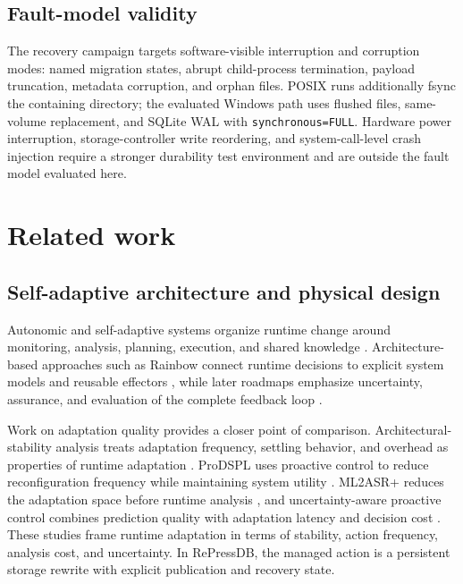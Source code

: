 \documentclass[final,5p,times,twocolumn,authoryear]{elsarticle}
\begin{document}
\subsection{Fault-model validity}

The recovery campaign targets software-visible interruption and corruption modes: named migration states, abrupt child-process termination, payload truncation, metadata corruption, and orphan files. POSIX runs additionally fsync the containing directory; the evaluated Windows path uses flushed files, same-volume replacement, and SQLite WAL with \texttt{synchronous=FULL}. Hardware power interruption, storage-controller write reordering, and system-call-level crash injection require a stronger durability test environment and are outside the fault model evaluated here.

\section{Related work}
\label{sec:related_work}

\subsection{Self-adaptive architecture and physical design}

Autonomic and self-adaptive systems organize runtime change around monitoring, analysis, planning, execution, and shared knowledge \citep{kephart2003vision,salehie2009landscape}. Architecture-based approaches such as Rainbow connect runtime decisions to explicit system models and reusable effectors \citep{garlan2004rainbow}, while later roadmaps emphasize uncertainty, assurance, and evaluation of the complete feedback loop \citep{delemos2013roadmap,krupitzer2015survey}.

Work on adaptation quality provides a closer point of comparison. Architectural-stability analysis treats adaptation frequency, settling behavior, and overhead as properties of runtime adaptation \citep{salama2017stability}. ProDSPL uses proactive control to reduce reconfiguration frequency while maintaining system utility \citep{ayala2021prodspl}. ML2ASR+ reduces the adaptation space before runtime analysis \citep{quin2022adaptationspace}, and uncertainty-aware proactive control combines prediction quality with adaptation latency and decision cost \citep{chen2024reliable}. These studies frame runtime adaptation in terms of stability, action frequency, analysis cost, and uncertainty. In RePressDB, the managed action is a persistent storage rewrite with explicit publication and recovery state.
\end{document}
